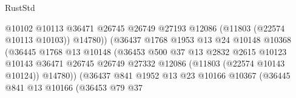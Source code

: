 \begin{lexlean}{RustStd}
\begin{coremodule}
                                              @10102
                                              @10113
                                              @36471
                                              @26745
                                              @26749
                                              @27193
                                              @12086
                                              (@11803 (@22574 @10113 @10103))
                                              @14780))
                                          (@36437
                                            @1768
                                            @1953
                                            @13
                                            @24
                                            @10148
                                            @10368
                                            (@36445
                                              @1768
                                              @13
                                              @10148
                                              (@36453
                                                @500
                                                @37
                                                @13
                                                @2832
                                                @2615
                                                @10123
                                                @10143
                                                @36471
                                                @26745
                                                @26749
                                                @27332
                                                @12086
                                                (@11803 (@22574 @10143 @10124))
                                                @14780))
                                            (@36437
                                              @841
                                              @1952
                                              @13
                                              @23
                                              @10166
                                              @10367
                                              (@36445
                                                @841
                                                @13
                                                @10166
                                                (@36453
                                                  @79
                                                  @37

\end{coremodule}
\end{lexlean}
